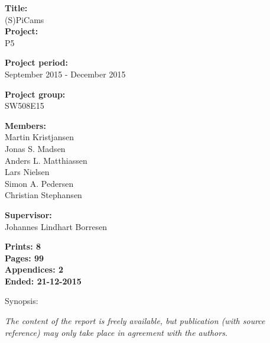 \begin{minipage}[t]{0.48\textwidth}
\textbf{Title:} \\[5pt]\bigskip\hspace{2ex}    
(S)PiCams\\
\textbf{Project:} \\[5pt]\bigskip\hspace{2ex}
P5

\textbf{Project period:} \\[5pt]\bigskip\hspace{2ex}
September 2015 - December 2015

\textbf{Project group:} \\[5pt]\bigskip\hspace{2ex}
SW508E15

\textbf{Members:} \\[5pt]\hspace*{2ex}
Martin Kristjansen \\\hspace*{2ex}
Jonas S. Madsen \\\hspace*{2ex}
Anders L. Matthiassen \\\hspace*{2ex}
Lars Nielsen \\\hspace*{2ex}
Simon A. Pedersen \\\hspace*{2ex}
Christian Stephansen


\textbf{Supervisor:} \\[5pt]\hspace*{2ex}
Johannes Lindhart Borresen


\vspace*{1cm}

\textbf{Prints: 8} \\
\textbf{Pages: 99} \\
\textbf{Appendices: 2} \\
\textbf{Ended: 21-12-2015}

\end{minipage}
\hfill
\begin{minipage}[t]{0.483\textwidth}
Synopsis: \\[5pt]
\fbox{\parbox{7cm}{\bigskip\bigskip}}
\end{minipage}

\vfill

{\footnotesize\itshape The content of the report is freely available, but publication (with source reference) may only take place in agreement with the authors.}

